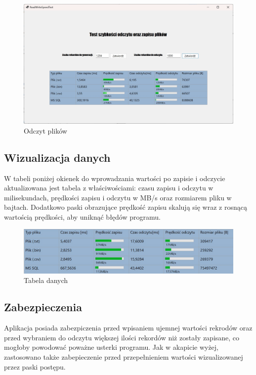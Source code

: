 \documentclass{report}
\begin{document}
\begin{figure}[h]
\centering
\includegraphics[width=15cm]{img/odczyt.jpg}
\caption{Odczyt plików}
\end{figure}

\subsection{Wizualizacja danych}
W tabeli poniżej okienek do wprowadzania wartości po zapisie i odczycie aktualizowana jest tabela z właściwościami: czasu zapisu i odczytu w milisekundach, prędkości zapisu i odczytu w MB/s oraz rozmiarem pliku w bajtach. Dodatkowo paski obrazujące prędkość zapisu skalują się wraz z rosnącą wartością prędkości, aby uniknąć błędów programu.

\begin{figure}[h]
\centering
\includegraphics[width=15cm]{img/tab.jpg}
\caption{Tabela danych}
\end{figure}

\subsection{Zabezpieczenia}
Aplikacja posiada zabezpiczenia przed wpisaniem ujemnej wartości rekrodów oraz przed wybraniem do odczytu większej ilości rekordów niż zostały zapisane, co mogłoby powodować poważne usterki programu. Jak w akapicie wyżej, zastosowano także zabepieczenie przed przepełnieniem wartości wizualizowanej przez paski postępu.
\end{document}
